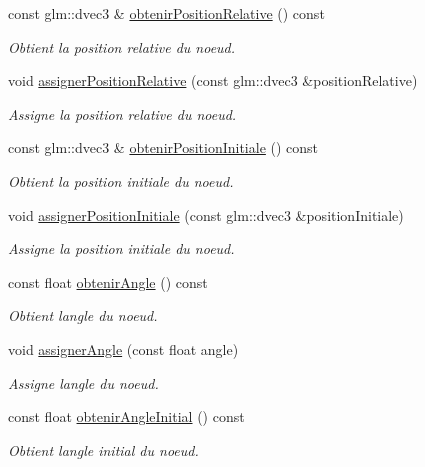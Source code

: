 \begin{DoxyCompactItemize}
const glm\+::dvec3 \& \hyperlink{group__inf2990_ga62d73f67c3b33e2cb106630bd1736a58}{obtenir\+Position\+Relative} () const 
\begin{DoxyCompactList}\small\item\em Obtient la position relative du noeud. \end{DoxyCompactList}\item 
void \hyperlink{group__inf2990_ga11e12e42b05a5327c92cd7fd1b7e5a24}{assigner\+Position\+Relative} (const glm\+::dvec3 \&position\+Relative)
\begin{DoxyCompactList}\small\item\em Assigne la position relative du noeud. \end{DoxyCompactList}\item 
const glm\+::dvec3 \& \hyperlink{group__inf2990_ga5e57e4e6ac1df01d25098fbeb7fcc56d}{obtenir\+Position\+Initiale} () const 
\begin{DoxyCompactList}\small\item\em Obtient la position initiale du noeud. \end{DoxyCompactList}\item 
void \hyperlink{group__inf2990_ga18ba04a32eaa8942418950a647e5e717}{assigner\+Position\+Initiale} (const glm\+::dvec3 \&position\+Initiale)
\begin{DoxyCompactList}\small\item\em Assigne la position initiale du noeud. \end{DoxyCompactList}\item 
const float \hyperlink{group__inf2990_ga9f5f0864e56b552efe95e693c198a3b4}{obtenir\+Angle} () const 
\begin{DoxyCompactList}\small\item\em Obtient l\textquotesingle{}angle du noeud. \end{DoxyCompactList}\item 
void \hyperlink{group__inf2990_ga7977957d758ca590a057aa33d76e5e75}{assigner\+Angle} (const float angle)
\begin{DoxyCompactList}\small\item\em Assigne l\textquotesingle{}angle du noeud. \end{DoxyCompactList}\item 
const float \hyperlink{group__inf2990_ga61797fb6a426150891203ea91e3f2cb8}{obtenir\+Angle\+Initial} () const 
\begin{DoxyCompactList}\small\item\em Obtient l\textquotesingle{}angle initial du noeud. \end{DoxyCompactList}\item 

\end{DoxyCompactItemize}
